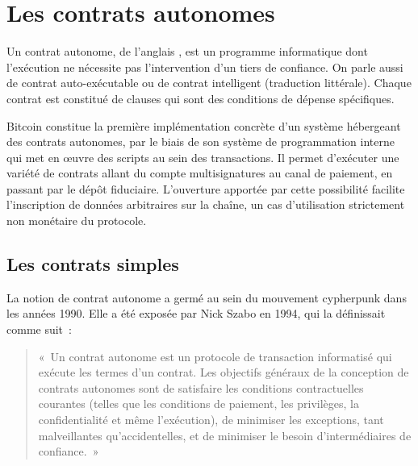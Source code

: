 
\chapter{Les contrats autonomes}
\label{ch:contrats} \label{enotezch:13}

Un contrat autonome, de l'anglais , est un programme informatique dont l'exécution ne nécessite pas l'intervention d'un tiers de confiance. On parle aussi de contrat auto-exécutable ou de contrat intelligent (traduction littérale). Chaque contrat est constitué de clauses qui sont des conditions de dépense spécifiques.

Bitcoin constitue la première implémentation concrète d'un système hébergeant des contrats autonomes, par le biais de son système de programmation interne qui met en œuvre des scripts au sein des transactions. Il permet d'exécuter une variété de contrats allant du compte multisignatures au canal de paiement, en passant par le dépôt fiduciaire. L'ouverture apportée par cette possibilité facilite l'inscription de données arbitraires sur la chaîne, un cas d'utilisation strictement non monétaire du protocole.

\section*{Les contrats simples}

La notion de contrat autonome a germé au sein du mouvement cypherpunk dans les années 1990. Elle a été exposée par Nick Szabo en 1994, qui la définissait comme suit~:

\begin{quote}
«~Un contrat autonome est un protocole de transaction informatisé qui exécute les termes d'un contrat. Les objectifs généraux de la conception de contrats autonomes sont de satisfaire les conditions contractuelles courantes (telles que les conditions de paiement, les privilèges, la confidentialité et même l'exécution), de minimiser les exceptions, tant malveillantes qu'accidentelles, et de minimiser le besoin d'intermédiaires de confiance.~»
\end{quote} %

